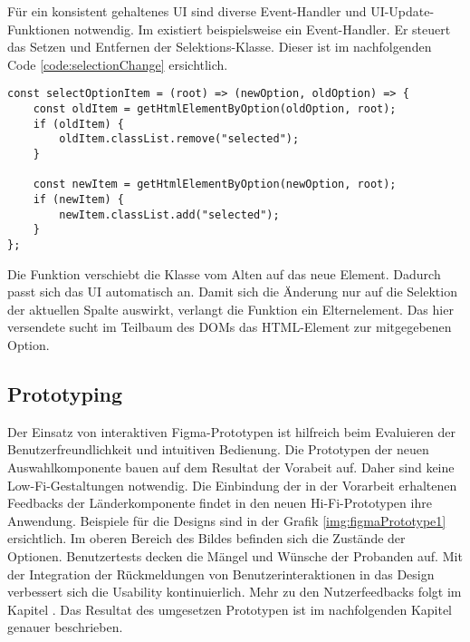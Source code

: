 Für ein konsistent gehaltenes UI sind diverse Event-Handler und UI-Update-Funktionen notwendig. 
Im  existiert beispielsweise ein Event-Handler. 
Er steuert das Setzen und Entfernen der Selektions-Klasse. 
Dieser ist im nachfolgenden Code \ref{code:selectionChange} ersichtlich. 

\begin{lstlisting}[style = htmlcssjs, caption = Änderung der Selektion, label = code:selectionChange]
const selectOptionItem = (root) => (newOption, oldOption) => {
    const oldItem = getHtmlElementByOption(oldOption, root);
    if (oldItem) {
        oldItem.classList.remove("selected");
    }

    const newItem = getHtmlElementByOption(newOption, root);
    if (newItem) {
        newItem.classList.add("selected");
    }
}; 
\end{lstlisting}

Die Funktion  verschiebt die Klasse  vom Alten auf das neue Element. 
Dadurch passt sich das UI automatisch an. 
Damit sich die Änderung nur auf die Selektion der aktuellen Spalte auswirkt, verlangt die Funktion ein Elternelement. 
Das hier versendete  sucht im Teilbaum des DOMs das HTML-Element zur mitgegebenen Option. 


\subsection{Prototyping}
\label{sec:userFeedbackPrototyping}

Der Einsatz von interaktiven Figma-Prototypen ist hilfreich beim Evaluieren der Benutzerfreundlichkeit und intuitiven Bedienung. 
Die Prototypen der neuen Auswahlkomponente bauen auf dem Resultat der Vorabeit auf. 
Daher sind keine Low-Fi-Gestaltungen notwendig. 
Die Einbindung der in der Vorarbeit erhaltenen Feedbacks der Länderkomponente findet in den neuen Hi-Fi-Prototypen ihre Anwendung. 
Beispiele für die Designs sind in der Grafik \ref{img:figmaPrototype1} ersichtlich. 
Im oberen Bereich des Bildes befinden sich die Zustände der Optionen. 
Benutzertests decken die Mängel und Wünsche der Probanden auf. 
Mit der Integration der Rückmeldungen von Benutzerinteraktionen in das Design verbessert sich die Usability kontinuierlich. 
Mehr zu den Nutzerfeedbacks folgt im Kapitel \textbf{}. 
Das Resultat des umgesetzen Prototypen ist im nachfolgenden Kapitel genauer beschrieben. 


